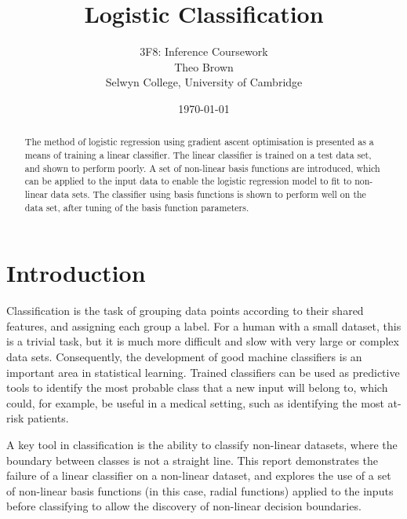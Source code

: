 \documentclass[a4paper]{article}
\begin{document}
    \title{Logistic Classification}
    \author{3F8: Inference Coursework \\ Theo Brown \\ Selwyn College, University of Cambridge}
    \date{\today}
    \maketitle

    \begin{abstract}
        The method of logistic regression using gradient ascent optimisation is presented as a means of training a
        linear classifier. The linear classifier is trained on a test data set, and shown to perform poorly. A set of
        non-linear basis functions are introduced, which can be applied to the input data to enable the logistic
        regression model to fit to non-linear data sets. The classifier using basis functions is shown to perform well
        on the data set, after tuning of the basis function parameters.
    \end{abstract}

    \section{Introduction}\label{sec:introduction}
    Classification is the task of grouping data points according to their shared features, and assigning each group
    a label. For a human with a small dataset, this is a trivial task, but it is much more difficult and slow with very
    large or complex data sets. Consequently, the development of good machine classifiers is an important area in
    statistical learning. Trained classifiers can be used as predictive tools to identify the most probable class that a
    new input will belong to, which could, for example, be useful in a medical setting, such as identifying the most
    at-risk patients.

    A key tool in classification is the ability to classify non-linear datasets, where the boundary between classes
    is not a straight line. This report demonstrates the failure of a linear classifier on a non-linear dataset, and
    explores the use of a set of non-linear basis functions (in this case, radial functions) applied to the inputs before
    classifying to allow the discovery of non-linear decision boundaries.
\end{document}
